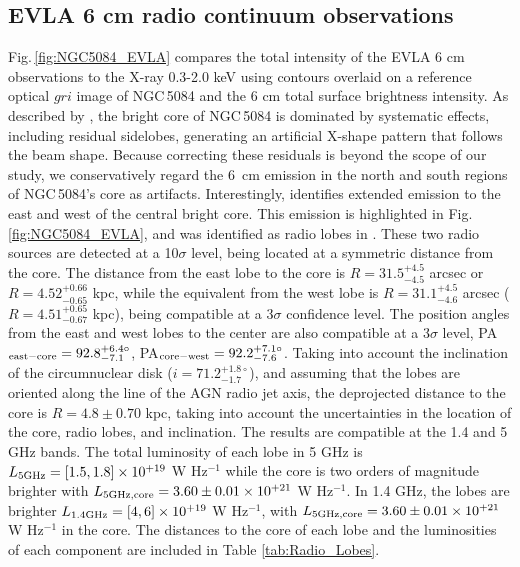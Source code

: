\documentclass[modern]{CORE-AAS/aastex631}
\begin{document}
\subsection{EVLA 6 cm radio continuum observations} \label{subsec:results_radiopol}
Fig.\,\ref{fig:NGC5084_EVLA} compares the total intensity of the EVLA 6 cm observations to the X-ray 0.3-2.0 keV using contours overlaid on a reference optical $gri$ image of NGC\,5084 and the 6 cm total surface brightness intensity. As described by \citet{wiegert+2015aj150_81}, the bright core of NGC\,5084 is dominated by systematic effects, including residual sidelobes, generating an artificial X-shape pattern that follows the beam shape. Because correcting these residuals is beyond the scope of our study, we conservatively regard the 6~cm emission in the north and south regions of NGC\,5084's core as artifacts.
Interestingly, \citet{wiegert+2015aj150_81} identifies extended emission to the east and west of the central bright core. This emission is highlighted in Fig.\,\ref{fig:NGC5084_EVLA}, and was identified as radio lobes in \citet[][see their Table 10]{irwin+2019aj158_21}. These two radio sources are detected at a 10$\sigma$ level, being located at a symmetric distance from the core. The distance from the east lobe to the core is $R=31.5^{+4.5}_{-4.5}$ arcsec or $R=4.52^{+0.66}_{-0.65}$ kpc, while the equivalent from the west lobe is $R=31.1^{+4.5}_{-4.6}$ arcsec ($R=4.51^{+0.65}_{-0.67}$ kpc), being compatible at a 3$\sigma$ confidence level. The position angles from the east and west lobes to the center are also compatible at a 3$\sigma$ level, PA$_{\rm east - core} =92.8^{+6.4\circ}_{-7.1}$, PA$_{\rm core - west} =92.2^{+7.1\circ}_{-7.6}$. Taking into account the inclination of the circumnuclear disk ($i=71.2^{+1.8\circ}_{-1.7}$), and assuming that the lobes are oriented along the line of the AGN radio jet axis, the deprojected distance to the core is $R=4.8\pm0.70$ kpc, taking into account the uncertainties in the location of the core, radio lobes, and inclination. The results are compatible at the 1.4 and 5 GHz bands. The total luminosity of each lobe in 5 GHz is $L_{\rm 5 GHz} = [1.5,1.8] \times 10^{+19}$ W Hz$^{-1}$ while the core is two orders of magnitude brighter with $L_{\rm 5 GHz, core} = 3.60\pm0.01 \times 10^{+21}$ W Hz$^{-1}$. In 1.4 GHz, the lobes are brighter $L_{\rm 1.4 GHz} = [4,6] \times 10^{+19}$ W Hz$^{-1}$, with $L_{\rm 5 GHz, core} = 3.60\pm0.01 \times 10^{+21}$ W Hz$^{-1}$ in the core. The distances to the core of each lobe and the luminosities of each component are included in Table \ref{tab:Radio_Lobes}.  
\end{document}
